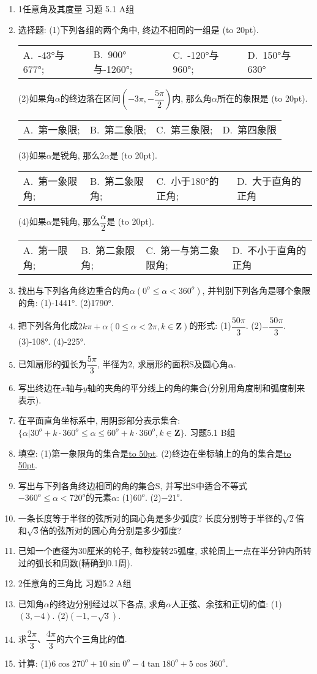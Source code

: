 \documentclass[10pt,a4paper]{article}
\newcommand{\blank}[1]{\underline{\hbox to #1pt{}}}
\newcommand{\bracket}[1]{(\hbox to #1pt{})}
\newcommand{\fourch}[4]{\par\begin{tabular}{p{.23\textwidth}p{.23\textwidth}p{.23\textwidth}p{.23\textwidth}}
A.~#1 &B.~#2& C.~#3& D.~#4
\end{tabular}}
\begin{document}
\begin{enumerate}[1.]

\item 1任意角及其度量
习题 5.1  A组
\item 选择题:
(1)下列各组的两个角中, 终边不相同的一组是				 			\bracket{20}.
\fourch{-43°与677°;}{900°与-1260°;}{-120°与960°;}{150°与630°}
(2)如果角$\alpha$的终边落在区间$(-3\pi ,-\dfrac{5\pi }2)$内, 那么角$\alpha$所在的象限是	\bracket{20}.
\fourch{第一象限;}{第二象限;}{第三象限;}{第四象限}
(3)如果$\alpha$是锐角, 那么$2\alpha$是										\bracket{20}.
\fourch{第一象限角;}{第二象限角;}{小于180°的正角;}{大于直角的正角}
(4)如果$\alpha$是钝角, 那么$\dfrac{\alpha }2$是											\bracket{20}.
\fourch{第一限角;}{第二象限角;}{第一与第二象限角;}{不小于直角的正角}
\item 找出与下列各角终边重合的角$\alpha (0^o\le \alpha <360^o)$, 并判别下列各角是哪个象限的角:
(1)-1441°.						(2)1790°.
\item 把下列各角化成$2k\pi +\alpha (0\le \alpha <2\pi ,k\in \mathbf{Z})$的形式:
(1)$\dfrac{50\pi }3$.							(2)$-\dfrac{50\pi }3$.
(3)-108°.						(4)-225°.
\item 已知扇形的弧长为$\dfrac{5\pi }3$, 半径为2, 求扇形的面积S及圆心角$\alpha$.
\item 写出终边在$x$轴与$y$轴的夹角的平分线上的角的集合(分别用角度制和弧度制来表示).
\item 在平面直角坐标系中, 用阴影部分表示集合: $\{\alpha|30^o+k\cdot 360^o\le \alpha \le 60^o+k\cdot 360^o,k\in \mathbf{Z}\}$.
习题5.1  B组
\item 填空:
(1)第一象限角的集合是\blank{50}.
(2)终边在坐标轴上的角的集合是\blank{50}.
\item 写出与下列各角终边相同的角的集合S, 并写出S中适合不等式$-360^o\le \alpha <720^o$的元素$\alpha$:
(1)$60^o$.							(2)$-21^o$.
\item 一条长度等于半径的弦所对的圆心角是多少弧度? 长度分别等于半径的$\sqrt 2$倍和$\sqrt 3$倍的弦所对的圆心角分别是多少弧度?
\item 已知一个直径为30厘米的轮子, 每秒旋转25弧度, 求轮周上一点在半分钟内所转过的弧长和周数(精确到0.1周).
\item 2任意角的三角比
习题5.2  A组
\item 已知角$\alpha$的终边分别经过以下各点, 求角$\alpha$人正弦、余弦和正切的值:
(1)$(3,-4)$.					(2)$(-1,-\sqrt 3)$.
\item 求$\dfrac{2\pi }3$、$\dfrac{4\pi }3$的六个三角比的值.
\item 计算:
(1)$6\cos 270^o+10\sin 0^o-4\tan 180^o+5\cos 360^o$.

\end{enumerate}
\end{document}
